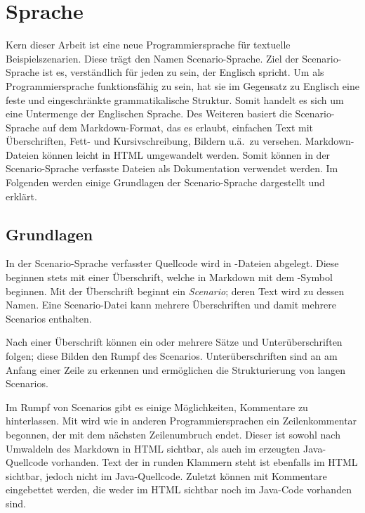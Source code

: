 \section{Sprache}\label{sec:language}

Kern dieser Arbeit ist eine neue Programmiersprache für textuelle Beispielszenarien.
Diese trägt den Namen Scenario-Sprache.
Ziel der Scenario-Sprache ist es, verständlich für jeden zu sein, der Englisch spricht.
Um als Programmiersprache funktionsfähig zu sein, hat sie im Gegensatz zu Englisch eine feste und eingeschränkte grammatikalische Struktur.
Somit handelt es sich um eine Untermenge der Englischen Sprache.
Des Weiteren basiert die Scenario-Sprache auf dem Markdown-Format,
das es erlaubt, einfachen Text mit Überschriften, Fett- und Kursivschreibung, Bildern u.ä.\ zu versehen.
Markdown-Dateien können leicht in HTML umgewandelt werden.
Somit können in der Scenario-Sprache verfasste Dateien als Dokumentation verwendet werden.
Im Folgenden werden einige Grundlagen der Scenario-Sprache dargestellt und erklärt.

\subsection{Grundlagen}\label{subsec:basics}

In der Scenario-Sprache verfasster Quellcode wird in -Dateien abgelegt.
Diese beginnen stets mit einer Überschrift, welche in Markdown mit dem \code{#}-Symbol beginnen.
Mit der Überschrift beginnt ein \emph{Scenario};
deren Text wird zu dessen Namen.
Eine Scenario-Datei kann mehrere Überschriften und damit mehrere Scenarios enthalten.

Nach einer Überschrift können ein oder mehrere Sätze und Unterüberschriften folgen;
diese Bilden den Rumpf des Scenarios.
Unterüberschriften sind an \code{##} am Anfang einer Zeile zu erkennen und ermöglichen die Strukturierung von langen Scenarios.

Im Rumpf von Scenarios gibt es einige Möglichkeiten, Kommentare zu hinterlassen.
Mit \code{//} wird wie in anderen Programmiersprachen ein Zeilenkommentar begonnen,
der mit dem nächsten Zeilenumbruch endet.
Dieser ist sowohl nach Umwaldeln des Markdown in HTML sichtbar,
als auch im erzeugten Java-Quellcode vorhanden.
Text der in runden Klammern  steht ist ebenfalls im HTML sichtbar,
jedoch nicht im Java-Quellcode.
Zuletzt können mit  Kommentare eingebettet werden,
die weder im HTML sichtbar noch im Java-Code vorhanden sind.

